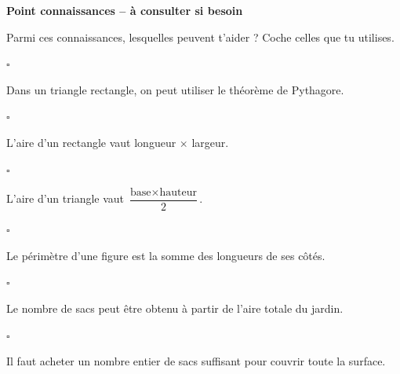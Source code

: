 \documentclass[11pt,a4paper]{article}
\newcommand{\casecocher}[1]{%
\noindent
\(\square\)\hspace{0.35em}%
\parbox[t]{0.89\linewidth}{#1}
\par
\vspace{0.15em}
}
\begin{document}
\begin{connaissancesbox}

{\sffamily\bfseries\color{SavoirC}
Point connaissances -- à consulter si besoin}

\smallskip

Parmi ces connaissances, lesquelles peuvent t'aider ?
Coche celles que tu utilises.

\smallskip

\begin{minipage}[t]{0.49\linewidth}

\casecocher{Dans un triangle rectangle,
on peut utiliser le théorème de Pythagore.}

\casecocher{L'aire d'un rectangle vaut
longueur \(\times\) largeur.}

\casecocher{L'aire d'un triangle vaut
\(\dfrac{\text{base}\times\text{hauteur}}{2}\).}

\end{minipage}
\hfill
\begin{minipage}[t]{0.49\linewidth}

\casecocher{Le périmètre d'une figure est la somme
des longueurs de ses côtés.}

\casecocher{Le nombre de sacs peut être obtenu
à partir de l'aire totale du jardin.}

\casecocher{Il faut acheter un nombre entier de sacs
suffisant pour couvrir toute la surface.}

\end{minipage}

\end{connaissancesbox}

\newpage

\end{document}
